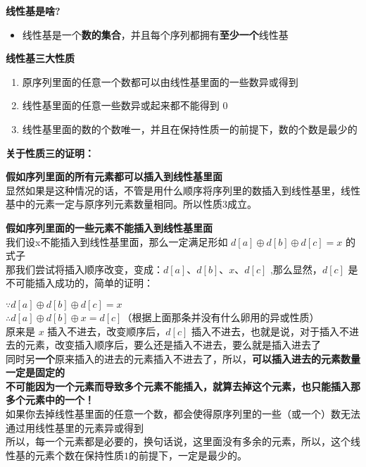 \documentclass[E:/GsjzTle/main/main.tex]{subfiles}
\begin{document}
\textbf{线性基是啥?}

\begin{itemize}
\item
  线性基是一个\textbf{数的集合}，并且每个序列都拥有\textbf{至少一个}线性基
\end{itemize}

\textbf{线性基三大性质}

\begin{enumerate}
\def\labelenumi{\arabic{enumi}.}
\item
  原序列里面的任意一个数都可以由线性基里面的一些数异或得到
\item
  线性基里面的任意一些数异或起来都不能得到 \(0\)
\item
  线性基里面的数的个数唯一，并且在保持性质一的前提下，数的个数是最少的
\end{enumerate}

\textbf{关于性质三的证明：}

\textbf{假如序列里面的所有元素都可以插入到线性基里面}\\
显然如果是这种情况的话，不管是用什么顺序将序列里的数插入到线性基里，线性基中的元素一定与原序列元素数量相同。所以性质\(3\)成立。

\textbf{假如序列里面的一些元素不能插入到线性基里面}\\
我们设x不能插入到线性基里面，那么一定满足形如
\(d[a] \oplus d[b] \oplus d[c]=x\) 的式子\\
那我们尝试将插入顺序改变，变成：\(d[a]、d[b]、x、d[c]\)
,那么显然，\(d[c]\) 是不可能插入成功的，简单的证明：

\(∵ d[a] \oplus d[b] \oplus d[c] = x\)\\
\(∴ d[a] \oplus d[b] \oplus x = d[c]\)（根据上面那条并没有什么卵用的异或性质）\\
原来是 \(x\) 插入不进去，改变顺序后，\(d[c]\)
插入不进去，也就是说，对于插入不进去的元素，改变插入顺序后，要么还是插入不进去，要么就是插入进去了\\
同时另\textbf{一个}原来插入的进去的元素插入不进去了，所以，\textbf{可以插入进去的元素数量一定是固定的}\\
\textbf{不可能因为一个元素而导致多个元素不能插入，就算去掉这个元素，也只能插入那多个元素中的一个！}\\
如果你去掉线性基里面的任意一个数，都会使得原序列里的一些（或一个）数无法通过用线性基里的元素异或得到\\
所以，每一个元素都是必要的，换句话说，这里面没有多余的元素，所以，这个线性基的元素个数在保持性质\(1\)的前提下，一定是最少的。
\end{document}
